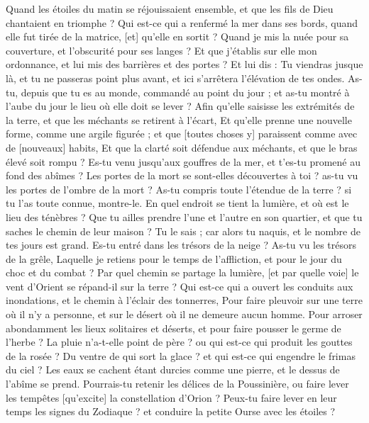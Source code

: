 \begin{multicols}{2}
Quand les étoiles du matin se réjouissaient ensemble, et que les fils de Dieu chantaient en triomphe ?
Qui est-ce qui a renfermé la mer dans ses bords, quand elle fut tirée de la matrice, [et] qu'elle en sortit ?
Quand je mis la nuée pour sa couverture, et l'obscurité pour ses langes ?
Et que j'établis sur elle mon ordonnance, et lui mis des barrières et des portes ?
Et lui dis : Tu viendras jusque là, et tu ne passeras point plus avant, et ici s'arrêtera l'élévation de tes ondes.
As-tu, depuis que tu es au monde, commandé au point du jour ; et as-tu montré à l'aube du jour le lieu où elle doit se lever ?
Afin qu'elle saisisse les extrémités de la terre, et que les méchants se retirent à l'écart,
Et qu'elle prenne une nouvelle forme, comme une argile figurée ; et que [toutes choses y] paraissent comme avec de [nouveaux] habits,
Et que la clarté soit défendue aux méchants, et que le bras élevé soit rompu ?
Es-tu venu jusqu'aux gouffres de la mer, et t'es-tu promené au fond des abîmes ?
Les portes de la mort se sont-elles découvertes à toi ? as-tu vu les portes de l'ombre de la mort ?
As-tu compris toute l'étendue de la terre ? si tu l'as toute connue, montre-le.
En quel endroit se tient la lumière, et où est le lieu des ténèbres ?
Que tu ailles prendre l'une et l'autre en son quartier, et que tu saches le chemin de leur maison ?
Tu le sais ; car alors tu naquis, et le nombre de tes jours est grand.
Es-tu entré dans les trésors de la neige ? As-tu vu les trésors de la grêle,
Laquelle je retiens pour le temps de l'affliction, et pour le jour du choc et du combat ?
Par quel chemin se partage la lumière, [et par quelle voie] le vent d'Orient se répand-il sur la terre ?
Qui est-ce qui a ouvert les conduits aux inondations, et le chemin à l'éclair des tonnerres,
Pour faire pleuvoir sur une terre où il n'y a personne, et sur le désert où il ne demeure aucun homme.
Pour arroser abondamment les lieux solitaires et déserts, et pour faire pousser le germe de l'herbe ?
La pluie n'a-t-elle point de père ? ou qui est-ce qui produit les gouttes de la rosée ?
Du ventre de qui sort la glace ? et qui est-ce qui engendre le frimas du ciel ?
Les eaux se cachent étant durcies comme une pierre, et le dessus de l'abîme se prend.
Pourrais-tu retenir les délices de la Poussinière, ou faire lever les tempêtes [qu'excite] la constellation d'Orion ?
Peux-tu faire lever en leur temps les signes du Zodiaque ? et conduire la petite Ourse avec les étoiles ?

\end{multicols}
